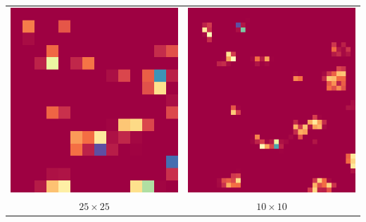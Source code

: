 \begin{center}
\begin{tabular}{c c}
		\includegraphics[scale=0.5]{spot_25_25.png} & \includegraphics[scale=0.5]{spot_10_10.png} \\
		$25 \times 25$  & $10 \times 10$ \\

\end{tabular}
\end{center}
